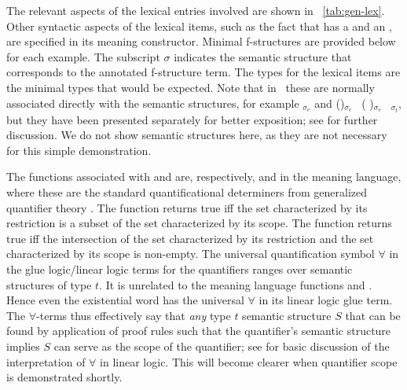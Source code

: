The relevant aspects of the lexical entries
involved are shown in \tablew~\ref{tab:gen-lex}.  Other syntactic aspects of the lexical items, such as the fact that  
 has a  and an , are specified
in its meaning constructor. Minimal f-structures are
provided below for each example. The subscript $\sigma$ indicates the
semantic structure that corresponds to the annotated
f-structure term. The types for the lexical items are the minimal types
that would be expected. Note that in \glue\ these are normally
associated directly with the semantic structures, for example
\Up$_{\sigma{_e}}$ and (\up {})$_{\sigma{_e}}$ \linimp\ (\up
{})$_{\sigma{_e}}$ \linimp\ \Up$_{\sigma{_t}}$, but they have
been presented separately for better exposition; see
\citet[299--305]{dalrymple;ea19} for further discussion. We do not
show semantic structures here, as they are not necessary for this
simple demonstration. 


The functions associated with  and  are, respectively,  and  in the meaning language, where these are the standard quantificational determiners from generalized quantifier theory \citep{Montague73a-u,BC81,keenan;faltz85}. The function  returns true iff the set characterized by its restriction is a subset of the set characterized by its scope. The function  returns true iff the intersection of the set characterized by its restriction and the set characterized by its scope is non-empty.  The universal quantification  symbol $\forall$ in the glue logic/linear logic terms for the quantifiers ranges over semantic structures of type $t$.  It is unrelated to the meaning language functions  and .  Hence even the existential word  has the universal $\forall$ in its linear logic glue term.  The $\forall$-terms thus effectively say that \emph{any} type $t$ semantic structure $S$ that can be found by application of proof rules such that the quantifier's semantic structure implies $S$ can serve as the scope of the quantifier; see \citet[393--394]{asudeh05-lp} for basic discussion of the interpretation of $\forall$ in linear logic. This will become clearer when quantifier scope is demonstrated shortly.

